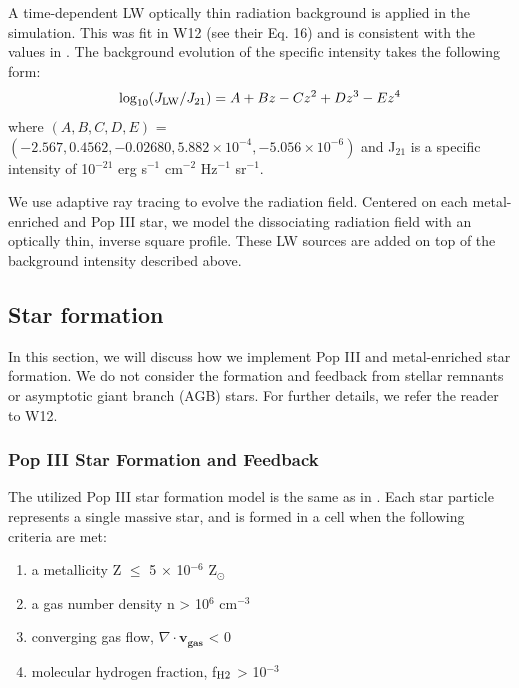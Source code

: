 \documentclass[a4paper,fleqn,usenatbib]{mnras}
\begin{document}
A time-dependent LW optically thin radiation background is applied in the simulation. This was fit in W12 (see their Eq. 16) and is consistent with the values in \citet{Trenti09_SFR}. The background evolution of the specific intensity takes the following form:
\begin{equation} \label{LWbg}
	\log_{10}(J_{\rm LW}/J_{21}) = A + Bz - Cz^{2} + Dz^{3} - Ez^{4}
\end{equation}
where $(A, B, C, D, E)$ = $(-2.567, 0.4562, - 0.02680, 5.882 \times 10^{-4}, - 5.056 \times 10^{-6})$ and J$_{21}$ is a specific intensity of 10$^{-21}$ erg s$^{-1}$ cm$^{-2}$ Hz$^{-1}$ sr$^{-1}$. 

We use adaptive ray tracing \citep{Abel02_RT, Wise11_Moray} to evolve the radiation field. Centered on each metal-enriched and Pop III star, we model the \hh{} dissociating radiation field with an optically thin, inverse square profile. These LW sources are added on top of the background intensity described above.
\subsection{Star formation}
In this section, we will discuss how we implement Pop III and metal-enriched star formation. We do not consider the formation and feedback from stellar remnants or asymptotic giant branch (AGB) stars. For further details, we refer the reader to W12. 

\subsubsection{Pop III Star Formation and Feedback }
The utilized Pop III star formation model is the same as in \citet{Wise08_Gal}. Each star particle represents a single massive star, and is formed in a cell when the following criteria are met: 
\begin{enumerate}
	\item a metallicity Z $\leq$ 5 $\times$ 10$^{-6}$ Z$_{\odot}$

	\item a gas number density n > 10$^{6}$ cm$^{-3}$

	\item converging gas flow, $\nabla \cdot \mathbf{v_{gas}}$ < 0 

	\item molecular hydrogen fraction, f$_{\rm H2}$ > 10$^{-3}$
\end{enumerate}
\end{document}
